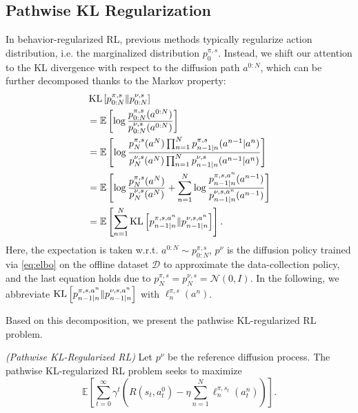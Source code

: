 \subsection{Pathwise KL Regularization}\label{sec:pathwise_kl}

In behavior-regularized RL, previous methods typically regularize action distribution, i.e. the marginalized distribution $p^{\pi, s}_{0}$. Instead, we shift our attention to the KL divergence with respect to the diffusion path $a^{0:N}$, which can be further decomposed thanks to the Markov property: 
\begin{equation}\label{eq:pathwise_kl}
    \begin{aligned}
        &\operatorname{KL}\left[p^{\pi, s}_{0:N}\|p^{\nu, s}_{0:N}\right]\\
        &=\mathbb{E}\left[\log\frac{p^{\pi, s}_{0:N}(a^{0:N})}{p^{\nu, s}_{0:N}(a^{0:N})}\right]\\
        &=\mathbb{E}\left[\log \frac{p_N^{\pi,s}(a^N)\prod_{n=1}^Np_{n-1|n}^{\pi,s}(a^{n-1}|a^n)}{p_N^{\nu,s}(a^N)\prod_{n=1}^Np_{n-1|n}^{\nu,s}(a^{n-1}|a^n)}\right]\\
        &=\mathbb{E}\left[\log \frac{p^{\pi, s}_{N}(a^{N})}{p^{\nu, s}_{N}(a^{N})}+\sum_{n=1}^{N}\log\frac{p^{\pi, s,a^n}_{n-1|n}(a^{n-1})}{p^{\nu, s,a^n}_{n-1|n}(a^{n-1})}\right]\\
        &=\mathbb{E}\left[\sum_{n=1}^{N}\operatorname{KL}\left[p^{\pi, s,a^n}_{n-1|n}\|p^{\nu, s,a^n}_{n-1|n}\right]\right]. 
    \end{aligned}
\end{equation}
Here, the expectation is taken w.r.t. $a^{0:N}\sim p^{\pi, s}_{0:N}$, $p^{\nu}$ is the diffusion policy trained via \eqref{eq:elbo} on the offline dataset $\mathcal{D}$ to approximate the data-collection policy, and the last equation holds due to $p_N^{\pi,s}=p_{N}^{\nu,s}=\mathcal{N}(0, I)$. In the following, we abbreviate $\operatorname{KL}\left[p^{\pi, s,a^n}_{n-1|n}\|p^{\nu, s,a^n}_{n-1|n}\right]$ with $\ell^{\pi,s}_{n}(a^n)$.

Based on this decomposition, we present the pathwise KL-regularized RL problem.
\begin{definition}\label{problem:pathwise_kl_brl}
    \textit{(Pathwise KL-Regularized RL)} Let $p^{\nu}$ be the reference diffusion process. The pathwise KL-regularized RL problem seeks to maximize
    \begin{equation}
    \label{eq:pathwise_kl_obj}
        \mathbb{E}\left[\sum_{t=0}^\infty \gamma^t\left(R(s_t,a_t^0)-\eta\sum_{n=1}^N\ell_{n}^{\pi,s_t}(a_t^n)\right)\right].
    \end{equation}
\end{definition}

